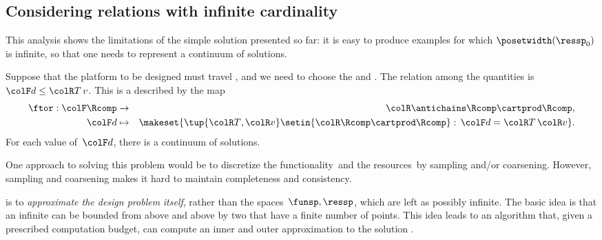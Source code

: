 \subsection{Considering relations with infinite cardinality}

This analysis shows the limitations of the simple solution presented so far: it is easy to produce examples for which $\posetwidth(\ressp_{0})$ is infinite, so that one needs to represent a continuum of solutions.

\begin{example}
    Suppose that the platform to be designed must travel , and we need to choose the  and .
    The relation among the quantities is~${\colF d}\leq{\colR T\,v}$.
    This is a  described by the map
    \begin{eqnarray*}
        \ftor:{\colF\Rcomp} & \to & {\colR\antichains\Rcomp\cartprod\Rcomp,}\\
        {\colF d} & \mapsto & \makeset{\tup{{\colR T},{\colR v}}\setin{\colR\Rcomp\cartprod\Rcomp}:\,{\colF d}={\colR T}\,{\colR v}}.
    \end{eqnarray*}
    For each value of~${\colF d}$, there is a continuum of solutions.
\end{example}
One approach to solving this problem would be to discretize the functionality~\funsp and the resources~\ressp by sampling and/or coarsening.
However, sampling and coarsening makes it hard to maintain completeness and consistency.

%
%
is to \emph{approximate the design problem} \emph{itself}, rather than the spaces~$\funsp,\ressp$, which are left as possibly infinite.
The basic idea is that an infinite  can be bounded from above and above by two  that have a finite number of points.
This idea leads to an algorithm that, given a prescribed computation budget, can compute an inner and outer approximation to the solution .
